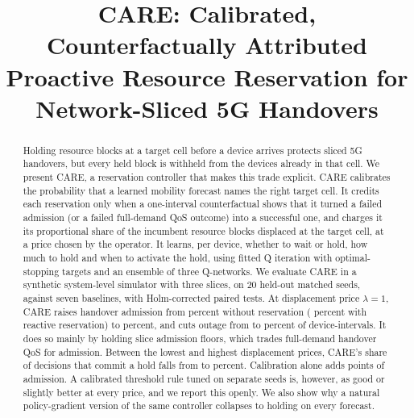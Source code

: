 \documentclass[conference]{IEEEtran}
\def\nosignaux#1#2\relax{\ifx+#1#2\else#1#2\fi}
\newcommand{\nosign}[1]{\expandafter\nosignaux#1\relax}
\begin{document}
\title{CARE: Calibrated, Counterfactually Attributed Proactive Resource Reservation for Network-Sliced 5G Handovers}

\author{
}

\maketitle

\begin{abstract}
Holding resource blocks at a target cell before a device arrives protects sliced 5G handovers, but every held block is withheld from the devices already in that cell. We present CARE, a reservation controller that makes this trade explicit. CARE calibrates the probability that a learned mobility forecast names the right target cell. It credits each reservation only when a one-interval counterfactual shows that it turned a failed admission (or a failed full-demand QoS outcome) into a successful one, and charges it its proportional share of the incumbent resource blocks displaced at the target cell, at a price chosen by the operator. It learns, per device, whether to wait or hold, how much to hold and when to activate the hold, using fitted Q iteration with optimal-stopping targets and an ensemble of three Q-networks. We evaluate CARE in a synthetic system-level simulator with three slices, on 20 held-out matched seeds, against seven baselines, with Holm-corrected paired tests. At displacement price $\lambda=1$, CARE raises handover admission from \NoResHSR{} percent without reservation (\ReactiveHSR{} percent with reactive reservation) to \CareHSR{} percent, and cuts outage from \NoResOutage{} to \CareOutage{} percent of device-intervals. It does so mainly by holding slice admission floors, which trades full-demand handover QoS for admission. Between the lowest and highest displacement prices, CARE's share of decisions that commit a hold falls from \LamQuarterCareHold{} to \LamSixteenCareHold{} percent. Calibration alone adds \nosign{\VsCareUncalHSRDiff} points of admission. A calibrated threshold rule tuned on separate seeds is, however, as good or slightly better at every price, and we report this openly. We also show why a natural policy-gradient version of the same controller collapses to holding on every forecast.
\end{abstract}
\end{document}
